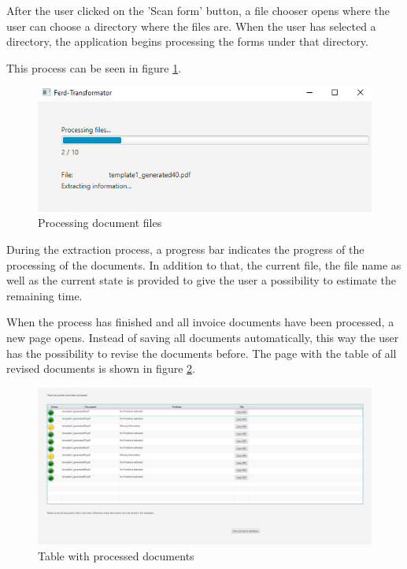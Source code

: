 After the user clicked on the 'Scan form' button, a file chooser opens where the user can choose a directory where the files are. When the user has selected a directory, the application begins processing the forms under that directory.

This process can be seen in figure \ref{processingFiles}.

\begin{figure}[ht!]
\centering
\includegraphics[scale=0.6]{Images/GUI/processingFiles.png}
\caption{Processing document files \label{processingFiles}}
\end{figure}

During the extraction process, a progress bar indicates the progress of the processing of the documents. In addition to that, the current file, the file name as well as the current state is provided to give the user a possibility to estimate the remaining time.

When the process has finished and all invoice documents have been processed, a new page opens. Instead of saving all documents automatically, this way the user has the possibility to revise the documents before.
The page with the table of all revised documents is shown in figure \ref{reviseBeforeSafe}.

\begin{figure}[ht!]
\centering
\includegraphics[width=\textwidth]{Images/GUI/reviseBeforeSafe.png}
\caption{Table with processed documents \label{reviseBeforeSafe}}
\end{figure}

